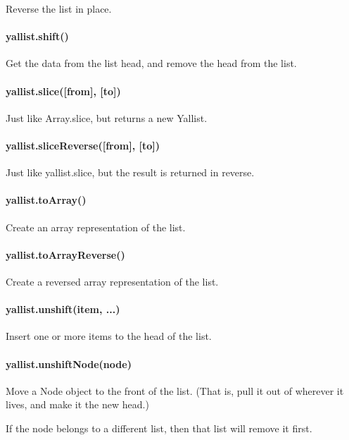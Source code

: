 Reverse the list in place.

\paragraph*{yallist.\+shift()}

Get the data from the list head, and remove the head from the list.

\paragraph*{yallist.\+slice(\mbox{[}from\mbox{]}, \mbox{[}to\mbox{]})}

Just like Array.\+slice, but returns a new Yallist.

\paragraph*{yallist.\+slice\+Reverse(\mbox{[}from\mbox{]}, \mbox{[}to\mbox{]})}

Just like yallist.\+slice, but the result is returned in reverse.

\paragraph*{yallist.\+to\+Array()}

Create an array representation of the list.

\paragraph*{yallist.\+to\+Array\+Reverse()}

Create a reversed array representation of the list.

\paragraph*{yallist.\+unshift(item, ...)}

Insert one or more items to the head of the list.

\paragraph*{yallist.\+unshift\+Node(node)}

Move a Node object to the front of the list. (That is, pull it out of wherever it lives, and make it the new head.)

If the node belongs to a different list, then that list will remove it first.

